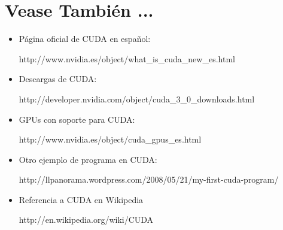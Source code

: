 \section{Vease También ...}
\begin{itemize}
 \item Página oficial de CUDA en español:
  \begin{center}
    http://www.nvidia.es/object/what\_is\_cuda\_new\_es.html
  \end{center}
 \item Descargas de CUDA:
  \begin{center}
   http://developer.nvidia.com/object/cuda\_3\_0\_downloads.html
  \end{center}
 \item GPUs con soporte para CUDA:
  \begin{center}
   http://www.nvidia.es/object/cuda\_gpus\_es.html
  \end{center}
\item Otro ejemplo de programa en CUDA:
  \begin{center}
    http://llpanorama.wordpress.com/2008/05/21/my-first-cuda-program/
  \end{center}
 \item Referencia a CUDA en Wikipedia
   \begin{center}
     http://en.wikipedia.org/wiki/CUDA
     \end{center}
\end{itemize}

